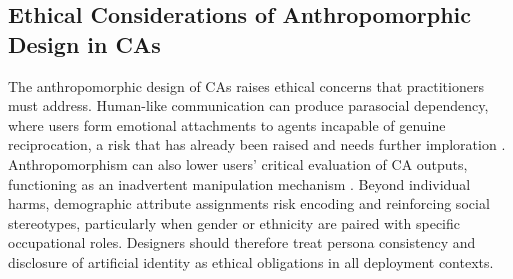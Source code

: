 \documentclass[manuscript,screen,review,anonymous]{acmart}
\DeclareRobustCommand{\change}[1]{%
    \textcolor{changeblue}{#1}%
  }
\DeclareRobustCommand{\change}[1]{#1}
\begin{document}
\subsection{Ethical Considerations of Anthropomorphic Design in CAs}
\change{The anthropomorphic design of CAs raises ethical concerns that practitioners must address. Human-like communication can produce parasocial dependency, where users form emotional attachments to agents incapable of genuine reciprocation, a risk that has already been raised and needs further imploration \citep{laura_kuenssberg_mothers_2025}. Anthropomorphism can also lower users' critical evaluation of CA outputs, functioning as an inadvertent manipulation mechanism \citep{chaves2021should}. Beyond individual harms, demographic attribute assignments risk encoding and reinforcing social stereotypes, particularly when gender or ethnicity are paired with specific occupational roles. Designers should therefore treat persona consistency and disclosure of artificial identity as ethical obligations in all deployment contexts.} %



\end{document}
